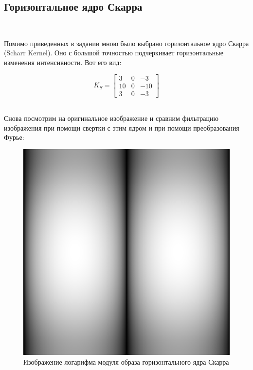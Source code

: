 \documentclass[a4paper]{article}
\begin{document}
\subsection{Горизонтальное ядро Скарра}\

Помимо приведенных в задании мною было выбрано горизонтальное ядро Скарра (Scharr Kernel). Оно с большой точностью подчеркивает горизонтальные изменения интенсивности. Вот его вид:

$$K_{S} =
\begin{bmatrix}
    3 & 0 & -3 \\
    10 & 0 & -10 \\
    3 & 0 & -3
\end{bmatrix}
$$\

Снова посмотрим на оригинальное изображение и сравним фильтрацию изображения при помощи свертки с этим ядром и при помощи преобразования Фурье:

\begin{figure}[H]
    \centering
    \includegraphics[width=0.47\linewidth]{2/abs_fourier_log_norm_laplacian.png}
    \caption{Изображение логарифма модуля образа горизонтального ядра Скарра}
\end{figure}\noindent
\end{document}
